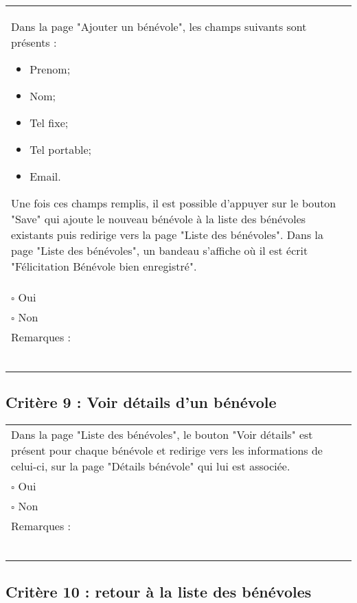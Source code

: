 	\begin{center}
    	 		\begin{tabular}[h]{|p{}|}
			\hline
				Dans la page "Ajouter un bénévole", les champs suivants sont présents : 
				\begin{itemize}
					\item Prenom;
					\item Nom;
					\item Tel fixe;
					\item Tel portable;
					\item Email.
				\end{itemize}
				Une fois ces champs remplis, il est possible d'appuyer sur le bouton "Save" qui ajoute le nouveau bénévole à la liste des bénévoles existants puis redirige vers la page "Liste des bénévoles". Dans la page "Liste des bénévoles", un bandeau s'affiche où il est écrit "Félicitation Bénévole bien enregistré". \\
				$\square$ Oui  \\ $\square$ Non \\\hline Remarques : \\ ~\\
			 \\\hline
     		\end{tabular}
  		\end{center}	
  		
  		
  		\subsection*{Critère 9 : Voir détails d'un bénévole}
	
	\begin{center}
    	 		\begin{tabular}[h]{|p{}|}
			\hline
				Dans la page "Liste des bénévoles", le bouton "Voir détails" est présent pour chaque bénévole et redirige vers les informations de celui-ci, sur la page "Détails bénévole" qui lui est associée.\\
				$\square$ Oui  \\ $\square$ Non \\\hline Remarques : \\ ~\\
			 \\\hline
     		\end{tabular}
  		\end{center}	
  		
  		
  		\subsection*{Critère 10 : retour à la liste des bénévoles}
	
